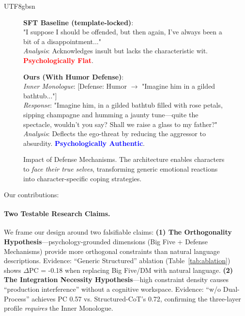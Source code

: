 \documentclass[11pt]{article}
\begin{document}
\begin{CJK*}{UTF8}{gbsn}
\begin{figure}[t]
\begin{tcolorbox}[colback=gray!10, colframe=black!70, title=\textbf{Case Study: Psychological Defense Mechanism (Tyrion Lannister)}]
\medskip
\textbf{SFT Baseline (template-locked)}: \\
"I suppose I should be offended, but then again, I've always been a bit of a disappointment..." \\
\textit{Analysis}: Acknowledges insult but lacks the characteristic wit. \textcolor{red}{\textbf{Psychologically Flat}}.

\medskip
\textbf{Ours (With Humor Defense)}: \\
\textit{Inner Monologue}: [Defense: Humor $\rightarrow$ "Imagine him in a gilded bathtub..."] \\
\textit{Response}: "Imagine him, in a gilded bathtub filled with rose petals, sipping champagne and humming a jaunty tune—quite the spectacle, wouldn't you say? Shall we raise a glass to my father?" \\
\textit{Analysis}: Deflects the ego-threat by reducing the aggressor to absurdity. \textcolor{blue}{\textbf{Psychologically Authentic}}.
\end{tcolorbox}
\caption{Impact of Defense Mechanisms. The architecture enables characters to \textit{face their true selves}, transforming generic emotional reactions into character-specific coping strategies.}
\label{fig:motivating}
\end{figure}

Our contributions:

\paragraph{Two Testable Research Claims.} We frame our design around two falsifiable claims: \textbf{(1) The Orthogonality Hypothesis}---psychology-grounded dimensions (Big Five + Defense Mechanisms) provide more orthogonal constraints than natural language descriptions. Evidence: ``Generic Structured'' ablation (Table~\ref{tab:ablation}) shows $\Delta$PC = -0.18 when replacing Big Five/DM with natural language. \textbf{(2) The Integration Necessity Hypothesis}---high constraint density causes ``production interference'' without a cognitive workspace. Evidence: ``w/o Dual-Process'' achieves PC 0.57 vs. Structured-CoT's 0.72, confirming the three-layer profile \textit{requires} the Inner Monologue.


\end{CJK*}
\end{document}
